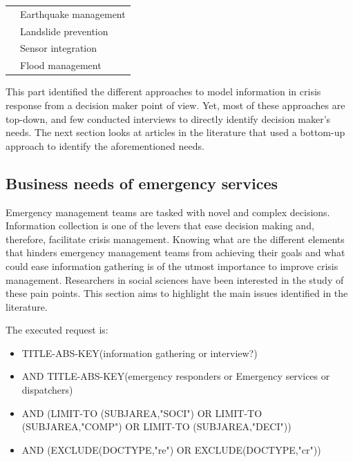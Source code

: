 \begin{table}[bp]
\begin{tabular}{m{} m{}}
        \cite{xuModelingRepresentationEarthquake2014}           & Earthquake management                  \\
        \cite{jungOntologydrivenSlopeModeling2015}              & Landslide prevention                   \\
        \cite{posladSemanticIoTEarly2015}                       & Sensor integration                     \\
        \cite{qiuIntegratedFloodManagement2017}                 & Flood management                       \\
        \bottomrule
    \end{tabular}
    \label{table:situation-models-main-articles}
\end{table}

This part identified the different approaches to model information in crisis response from a decision maker point of view.
Yet, most of these approaches are top-down, and few conducted interviews to directly identify decision maker's needs.
The next section looks at articles in the literature that used a bottom-up approach to identify the aforementioned needs.

\subsection{Business needs of emergency services}
Emergency management teams are tasked with novel and complex decisions.
Information collection is one of the levers that ease decision making and, therefore,
facilitate crisis management.
Knowing what are the different elements that hinders emergency management teams from
achieving their goals and what could ease information gathering is of the utmost importance to improve crisis management.
Researchers in social sciences have been interested in the study of these pain points.
This section aims to highlight the main issues identified in the literature.

The executed request is:

\begin{itemize}
    \item TITLE-ABS-KEY({information gathering} or interview?)
    \item AND TITLE-ABS-KEY({emergency responders} or {Emergency services} or {dispatchers})
    \item AND (LIMIT-TO (SUBJAREA,"SOCI") OR LIMIT-TO (SUBJAREA,"COMP") OR LIMIT-TO (SUBJAREA,"DECI"))
    \item AND (EXCLUDE(DOCTYPE,"re") OR EXCLUDE(DOCTYPE,"cr"))
\end{itemize}

